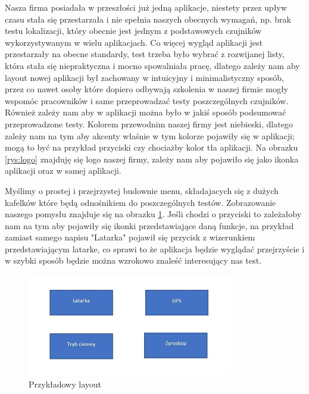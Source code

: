 \newpage

Nasza firma posiadała w przeszłości już jedną aplikacje, niestety przez upływ czasu stała się przestarzała i nie spełnia naszych obecnych wymagań, np. brak testu lokalizacji, który obecnie jest jednym z podstawowych czujników wykorzystywanym w wielu aplikacjach. Co więcej wygląd aplikacji jest przestarzały na obecne standardy, test trzeba było wybrać z rozwijanej listy, która stała się niepraktyczna i mocno spowalniała pracę, dlatego zależy nam aby layout nowej aplikacji był zachowany w intuicyjny i minimalistyczny sposób, przez co nawet osoby które dopiero odbywają szkolenia w naszej firmie mogły wspomóc pracowników i same przeprowadzać testy poszczególnych czujników. Również zależy nam aby w aplikacji można było w jakiś sposób podsumować przeprowadzone testy. Kolorem przewodnim naszej firmy jest niebieski, dlatego zależy nam na tym aby akcenty właśnie w tym kolorze pojawiły się w aplikacji; mogą to być na przykład przyciski czy chociażby kolor tła aplikacji. Na obrazku \ref{rys:logo} znajduję się logo naszej firmy, zależy nam aby pojawiło się jako ikonka aplikacji oraz w samej aplikacji. \newline 

Myślimy o prostej i przejrzystej budownie menu, składajacych się z dużych kafelków które będą odnośnikiem do poszczególnych testów. Zobrazowanie naszego pomysłu znajduje się na obrazku \ref{rys:layout}. \newline 
Jeśli chodzi o przyciski to zależałoby nam na tym aby pojawiły się ikonki przedstawiające daną funkcje, na przykład zamiast samego napisu "Latarka" pojawił się przycisk z wizerunkiem przedstawiającym latarke, co sprawi to że aplikacja będzie wyglądać przejrzyście i w szybki sposób będzie można wzrokowo znaleść interesujący nas test. 

\begin{figure}[!hbt]
	\begin{center}
		\includegraphics[angle=360, width=0.80\textwidth]{rys/punkt1/Layout_1.jpg}
		\caption{Przykładowy layout}
		\label{rys:layout}
	\end{center}
\end{figure}




  


 
 
 
 
 